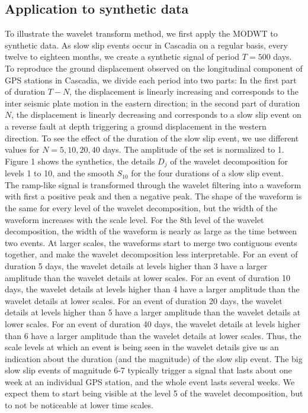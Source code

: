 \documentclass{article}
\begin{document}
\subsection{Application to synthetic data}

To illustrate the wavelet transform method, we first apply the MODWT to synthetic data. As slow slip events occur in Cascadia on a regular basis, every twelve to eighteen months, we create a synthetic signal of period $T = 500$ days. To reproduce the ground displacement observed on the longitudinal component of GPS stations in Cascadia, we divide each period into two parts: In the first part of duration $T - N$, the displacement is linearly increasing and corresponds to the inter seismic plate motion in the eastern direction; in the second part of duration $N$, the displacement is linearly decreasing and corresponds to a slow slip event on a reverse fault at depth triggering a ground displacement in the western direction. To see the effect of the duration of the slow slip event, we use different values for $N = 5, 10, 20, 40$ days. The amplitude of the set is normalized to 1. Figure 1 shows the synthetics, the details $D_j$  of the wavelet decomposition for levels 1 to 10, and the smooth $S_{10}$ for the four durations of a slow slip event. \\

The ramp-like signal is transformed through the wavelet filtering into a waveform with first a positive peak and then a negative peak. The shape of the waveform is the same for every level of the wavelet decomposition, but the width of the waveform increases with the scale level. For the 8th level of the wavelet decomposition, the width of the waveform is nearly as large as the time between two events. At larger scales, the waveforms start to merge two contiguous events together, and make the wavelet decomposition less interpretable. For an event of duration 5 days, the wavelet details at levels higher than 3 have a larger amplitude than the wavelet details at lower scales. For an event of duration 10 days, the wavelet details at levels higher than 4 have a larger amplitude than the wavelet details at lower scales. For an event of duration 20 days, the wavelet details at levels higher than 5 have a larger amplitude than the wavelet details at lower scales. For an event of duration 40 days, the wavelet details at levels higher than 6 have a larger amplitude than the wavelet details at lower scales. Thus, the scale levels at which an event is being seen in the wavelet details give us an indication about the duration (and the magnitude) of the slow slip event. The big slow slip events of magnitude 6-7 typically trigger a signal that lasts about one week at an individual GPS station, and the whole event lasts several weeks. We expect them to start being visible at the level 5 of the wavelet decomposition, but to not be noticeable at lower time scales. \\
\end{document}
